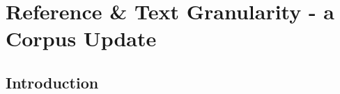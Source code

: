 \section{Reference \& Text Granularity - a Corpus Update}\label{sec:covgran-ux22}


\subsection{Introduction}




